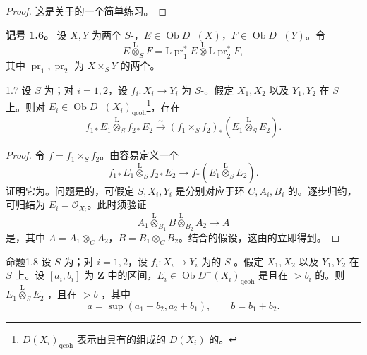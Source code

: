 \begin{proof}这是关于的一个简单练习。\end{proof}
\textbf{记号 1.6。} 设 $X,Y$ 为两个 $S$-，$E\in\operatorname{Ob}D^-(X)$，$F\in\operatorname{Ob}D^-(Y)$。令
\[E\mathbin{\overset{\mathrm L}{\otimes}}_SF
=\mathrm L\operatorname{pr}_1^*E\mathbin{\overset{\mathrm L}{\otimes}}\mathrm L\operatorname{pr}_2^*F,\]
其中 $\operatorname{pr}_1,\operatorname{pr}_2$ 为 $X\times_SY$ 的两个。
\begin{SGAresult}{}{1.7}
设 $S$ 为；对 $i=1,2$，设 $f_i:X_i\to Y_i$ 为 $S$-。假定 $X_1,X_2$ 以及 $Y_1,Y_2$ 在 $S$ 上。则对 $E_i\in\operatorname{Ob}D^-(X_i)_{\mathrm{qcoh}}$\footnote{$D(X_i)_{\mathrm{qcoh}}$ 表示由具有的组成的 $D(X_i)$ 的。}，存在
\[
f_{1*}E_1\mathbin{\overset{\mathrm L}{\otimes}}_Sf_{2*}E_2
\xrightarrow{\sim}(f_1\times_Sf_2)_*(E_1\mathbin{\overset{\mathrm L}{\otimes}}_SE_2).
\]
\end{SGAresult}
\begin{proof}
令 $f=f_1\times_Sf_2$。由容易定义一个
\[f_{1*}E_1\mathbin{\overset{\mathrm L}{\otimes}}_Sf_{2*}E_2\longrightarrow f_*(E_1\mathbin{\overset{\mathrm L}{\otimes}}_SE_2).\]
证明它为。问题是的，可假定 $S,X_i,Y_i$ 是分别对应于环 $C,A_i,B_i$ 的。逐步归约，可归结为 $E_i=\mathcal O_{X_i}$。此时须验证
\[A_1\mathbin{\overset{\mathrm L}{\otimes}}_{B_1}B\mathbin{\overset{\mathrm L}{\otimes}}_{B_2}A_2\longrightarrow A\]
是，其中 $A=A_1\otimes_CA_2$，$B=B_1\otimes_CB_2$。结合的假设，这由的立即得到。
\end{proof}
\begin{SGAresult}{命题}{1.8}
设 $S$ 为；对 $i=1,2$，设 $f_i:X_i\to Y_i$ 为的 $S$-。假定 $X_1,X_2$ 以及 $Y_1,Y_2$ 在 $S$ 上。设 $[a_i,b_i]$ 为 $\mathbf Z$ 中的区间，$E_i\in\operatorname{Ob}D^-(X_i)_{\mathrm{qcoh}}$ 是且在 $>b_i$ 的。则 $E_1\mathbin{\overset{\mathrm L}{\otimes}}_SE_2$ ，且在 $>b$ ，其中
\[a=\sup(a_1+b_2,a_2+b_1),\qquad b=b_1+b_2.\]
\end{SGAresult}

